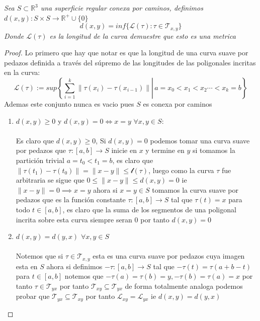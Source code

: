 \documentclass[11pt,letterpaper]{article}
\newcommand{\R}{\mathbb{R}}
\begin{document}
\begin{tcolorbox}[
	title = \textcolor{black}{\textcolor{white}{M\'etrica de Superficie regular conexa por caminos}},]
\textit{Sea $S\subset \R^3$ una superficie regular conexa por caminos, definimos $d(x,y):S\times S\to \R^{+}\cup\{0\} $
\begin{equation*}
    d(x,y)=inf\{\mathcal{L}(\tau):\tau\in \mathcal{T}_{x,y}\}
\end{equation*}
Donde $\mathcal{L}(\tau)$ es la longitud de la curva demuestre que esto es una metrica
}
\end{tcolorbox}
\begin{proof}
    Lo primero que hay que notar es que la longitud de una curva suave por pedazos definida a trav\'es del s\'upremo de las longitudes de las poligonales incritas en la curva:\,\\
    \begin{equation*}
        \mathcal{L}(\tau):=sup\left\{\sum_{i=1}^k\|\tau(x_i)-\tau(x_{i-1})\|\left|\right.\,a=x_0<x_1<x_2\cdots<x_k=b \right\}
    \end{equation*}
    Ademas este conjunto nunca es vacio pues $S$ es conexa por caminos
\begin{enumerate}
    \item $d(x,y)\geq 0$ y $d(x,y)=0\iff x=y$\,\,$\forall x,y\in S$:\,\\
    \,\\
    Es claro que $d(x,y)\geq 0$, Si $d(x,y)=0$ podemos tomar una curva suave por pedazos que $\tau:[a,b]\to S$ inicie en $x$ y termine en $y$ si tomamos la partici\'on trivial $a=t_0<t_1=b$, es claro que $\|\tau(t_1)-\tau(t_0)\|=\|x-y\|\leq \mathcal{l}(\tau)$, luego como la curva $\tau$ fue arbitraria se sigue que $0\leq \|x-y\|\leq d(x,y)=0$ ie $\|x-y\|=0\implies x=y$
    ahora si $x=y\in S$ tomamos la curva suave por pedazos que es la funci\'on constante $\tau:[a,b]\to S$ tal que $\tau(t)=x$ para todo $t\in [a,b]$, es claro que la suma de los segmentos de una poligonal incrita sobre esta curva siempre seran $0$ por tanto $d(x,y)=0$
    \item $d(x,y)=d(y,x)$\,\,$\forall x,y\in S$\,\\
    \,\\
    Notemos que si $\tau\in \mathcal{T}_{x,y}$ esta es una curva suave por pedazos cuya imagen esta en $S$ ahora si definimos $-\tau:[a,b]\to S$ tal que $-\tau(t)=\tau(a+b-t)$ para $t\in [a,b]$ notemos que $-\tau(a)=\tau(b)=y,-\tau(b)=\tau(a)=x$ por tanto $\tau\in \mathcal{T}_{yx}$ por tanto
    $\mathcal{T}_{xy}\subseteq\mathcal{T}_{yx}$ de forma totalmente analoga podemos probar que $\mathcal{T}_{yx}\subseteq\mathcal{T}_{xy}$ por tanto $\mathcal{L}_{xy}=\mathcal{L}_{yx}$ ie $d(x,y)=d(y,x)$

\end{enumerate}
\end{proof}
\end{document}
